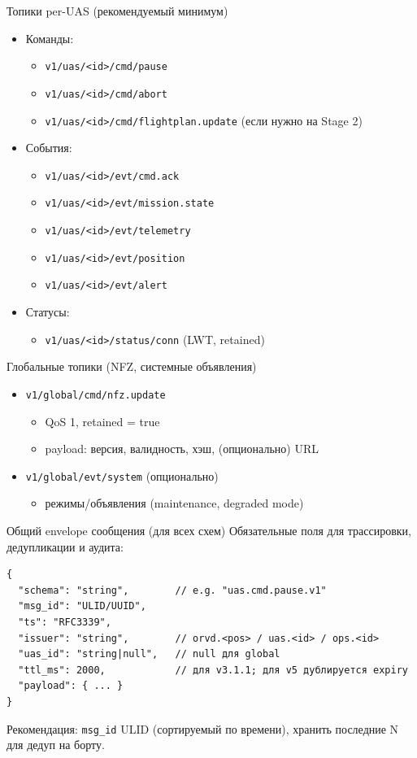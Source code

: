 \documentclass[aspectratio=169]{beamer}
\begin{document}
\begin{frame}{Топики per-UAS (рекомендуемый минимум)}
\begin{itemize}
  \item Команды:
  \begin{itemize}
    \item \texttt{v1/uas/<id>/cmd/pause}
    \item \texttt{v1/uas/<id>/cmd/abort}
    \item \texttt{v1/uas/<id>/cmd/flightplan.update} (если нужно на Stage 2)
  \end{itemize}
  \item События:
  \begin{itemize}
    \item \texttt{v1/uas/<id>/evt/cmd.ack}
    \item \texttt{v1/uas/<id>/evt/mission.state}
    \item \texttt{v1/uas/<id>/evt/telemetry}
    \item \texttt{v1/uas/<id>/evt/position}
    \item \texttt{v1/uas/<id>/evt/alert}
  \end{itemize}
  \item Статусы:
  \begin{itemize}
    \item \texttt{v1/uas/<id>/status/conn} (LWT, retained)
  \end{itemize}
\end{itemize}
\end{frame}

\begin{frame}{Глобальные топики (NFZ, системные объявления)}
\begin{itemize}
  \item \texttt{v1/global/cmd/nfz.update}
  \begin{itemize}
    \item QoS 1, retained = true
    \item payload: версия, валидность, хэш, (опционально) URL
  \end{itemize}
  \item \texttt{v1/global/evt/system} (опционально)
  \begin{itemize}
    \item режимы/объявления (maintenance, degraded mode)
  \end{itemize}
\end{itemize}
\end{frame}

\begin{frame}{Общий envelope сообщения (для всех схем)}
\small
Обязательные поля для трассировки, дедупликации и аудита:
\begin{verbatim}
{
  "schema": "string",        // e.g. "uas.cmd.pause.v1"
  "msg_id": "ULID/UUID",
  "ts": "RFC3339",
  "issuer": "string",        // orvd.<pos> / uas.<id> / ops.<id>
  "uas_id": "string|null",   // null для global
  "ttl_ms": 2000,            // для v3.1.1; для v5 дублируется expiry
  "payload": { ... }
}
\end{verbatim}
Рекомендация: \texttt{msg\_id} ULID (сортируемый по времени), хранить последние N для дедуп на борту.
\end{frame}
\end{document}
